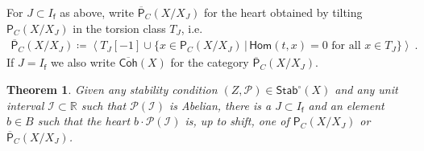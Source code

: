 \documentclass[reqno,a4paper]{amsart}
\newcommand{\calI}{\mathcal{I}}
\newcommand{\calP}{\mathcal{P}}
\newcommand{\R}{\mathbb{R}}
\newcommand{\sff}{\mathsf{f}}
\newcommand{\catPC}{\mathsf{P}_{C}}
\newcommand{\barcatPC}{\overline{\mathsf{P}}_{C}}
\newcommand{\Stab}{\mathsf{Stab}}
\newcommand{\barcatCoh}{\overline{\mathsf{Coh}}}
\newcommand{\rsv}{X}
\newcommand{\psv}{X_J}
\newcommand{\Hom}{\mathsf{Hom}}
\theoremstyle{basic-theorem}
\newtheorem{theorem}{Theorem}[section]
\numberwithin{equation}{section}
\begin{document}
\begin{definition}
    For $J\subset I_\sff$ as above, write $\barcatPC(\rsv/\psv)$ for the heart obtained by tilting $\catPC(\rsv/\psv)$ in the torsion class $T_J$, i.e.\
	\begin{align}
		\barcatPC(\rsv/\psv) \coloneqq\left\langle T_J[-1]\cup \{x\in\catPC(\rsv/\psv)\,\vert\, \Hom(t,x)=0\text{ for all }x\in T_J\} \right\rangle\ .
	\end{align}
    If $J=I_\sff$ we also write $\barcatCoh(\rsv)$ for the category $\barcatPC(\rsv/\psv)$.
\end{definition}

\begin{theorem}\label{thm:allstabs}
    Given any stability condition $(Z,\calP)\in \Stab^\circ(\rsv)$ and any unit interval $\calI\subset \R$ such that $\calP(\calI)$ is Abelian, there is a $J\subset I_\sff$ and an element $b\in B$ such that the heart $b\cdot \calP(\calI)$ is, up to shift, one of $\catPC(\rsv/\psv)$ or $\barcatPC(\rsv/\psv)$.
\end{theorem}
\end{document}
